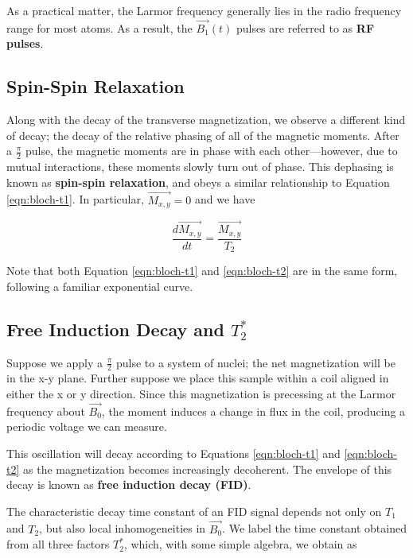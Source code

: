 \documentclass[%
 reprint,
 amsmath,amssymb,
 aps,
]{revtex4-2}
\newcommand{\halfpi}{\frac{\pi}{2}}
\begin{document}
As a practical matter, the Larmor frequency generally lies in the radio frequency range for most atoms. As a result, the $\vec{B_1}(t)$ pulses are referred to as \textbf{RF pulses}. 


\subsection{\label{sec:t2} Spin-Spin Relaxation}

Along with the decay of the transverse magnetization, we observe a different kind of decay; the decay of the relative phasing of all of the magnetic moments. After a $\halfpi$ pulse, the magnetic moments are in phase with each other---however, due to mutual interactions, these moments slowly turn out of phase. This dephasing is known as \textbf{spin-spin relaxation}, and obeys a similar relationship to Equation \ref{eqn:bloch-t1}. In particular, $\vec{M_{x,y}}= 0$ and we have 

\begin{equation}\label{eqn:bloch-t2}
    \frac{d\vec{M_{x,y}}}{dt} = \frac{\vec{M_{x,y}}}{T_2}
\end{equation}

Note that both Equation \ref{eqn:bloch-t1} and \ref{eqn:bloch-t2} are in the same form, following a familiar exponential curve. 


\subsection{Free Induction Decay and $T_2^*$}

Suppose we apply a $\halfpi$ pulse to a system of nuclei; the net magnetization will be in the x-y plane. Further suppose we place this sample within a coil aligned in either the x or y direction. Since this magnetization is precessing at the Larmor frequency about \(\vec{B_0}\), the moment induces a change in flux in the coil, producing a periodic voltage we can measure.

This oscillation will decay according to Equations \ref{eqn:bloch-t1} and \ref{eqn:bloch-t2} as the magnetization becomes increasingly decoherent. The envelope of this decay is known as \textbf{free induction decay (FID)}. 

The characteristic decay time constant of an FID signal depends not only on $T_1$ and $T_2$, but also local inhomogeneities in $\vec{B_0}$. We label the time constant obtained from all three factors $T_2^*$, which, with some simple algebra, we obtain as \cite{lab-manual}
\end{document}
